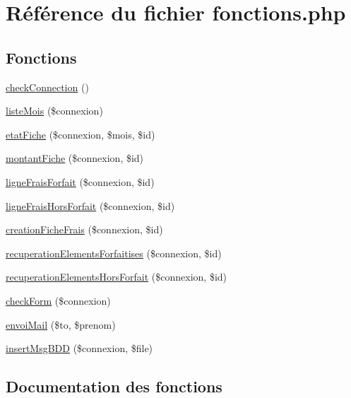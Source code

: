 \hypertarget{fonctions_8php}{}\section{Référence du fichier fonctions.\+php}
\label{fonctions_8php}
\subsection*{Fonctions}
\begin{DoxyCompactItemize}
\item 
\hyperlink{fonctions_8php_ab993a4c8521490dac33fb61731d9e72c}{check\+Connection} ()
\item 
\hyperlink{fonctions_8php_a8cd6439762b5a1e11cb058d728d52239}{liste\+Mois} (\$connexion)
\item 
\hyperlink{fonctions_8php_a94e520cd534026c820617045060399af}{etat\+Fiche} (\$connexion, \$mois, \$id)
\item 
\hyperlink{fonctions_8php_a0b2b8054d74bc86ab51b76d17b6ccb25}{montant\+Fiche} (\$connexion, \$id)
\item 
\hyperlink{fonctions_8php_aa71e684aa4fc47f7333777837bf2ce0f}{ligne\+Frais\+Forfait} (\$connexion, \$id)
\item 
\hyperlink{fonctions_8php_a228642404156eaaa4e0b6184f7a2a478}{ligne\+Frais\+Hors\+Forfait} (\$connexion, \$id)
\item 
\hyperlink{fonctions_8php_ae4babb3201c13dff4bad4cc4320938e6}{creation\+Fiche\+Frais} (\$connexion, \$id)
\item 
\hyperlink{fonctions_8php_a03aff82c0b2e5923252159c14ad1138e}{recuperation\+Elements\+Forfaitises} (\$connexion, \$id)
\item 
\hyperlink{fonctions_8php_a4e556eb902417f82fd8e9f320044d6f8}{recuperation\+Elements\+Hors\+Forfait} (\$connexion, \$id)
\item 
\hyperlink{fonctions_8php_af2e26f0cc2aebd7ba2f47b66b3c03ead}{check\+Form} (\$connexion)
\item 
\hyperlink{fonctions_8php_a19c2ee16c2ed23049a9e2a80def643d0}{envoi\+Mail} (\$to, \$prenom)
\item 
\hyperlink{fonctions_8php_a9a8293305578bcacfdf7b79c44245e63}{insert\+Msg\+B\+D\+D} (\$connexion, \$file)
\end{DoxyCompactItemize}


\subsection{Documentation des fonctions}
\hypertarget{fonctions_8php_ab993a4c8521490dac33fb61731d9e72c}{}
